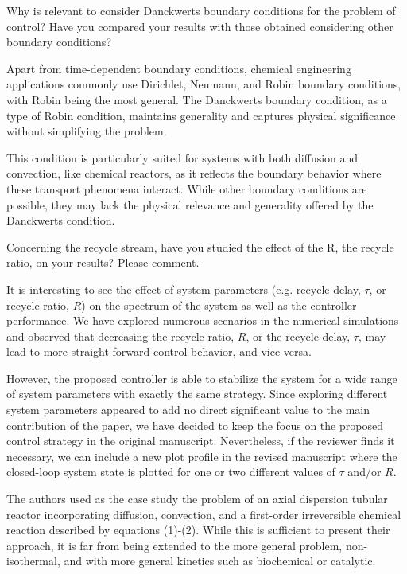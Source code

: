 \documentclass[12pt,answers]{exam}
\begin{document}
\begin{questions}

    \question Why is relevant to consider Danckwerts boundary conditions for the problem of control? Have you compared your results with those obtained considering other boundary conditions?

    \begin{solutionorbox}
        Apart from time-dependent boundary conditions, chemical engineering applications commonly use Dirichlet, Neumann, and Robin boundary conditions, with Robin being the most general. The Danckwerts boundary condition, as a type of Robin condition, maintains generality and captures physical significance without simplifying the problem.

        This condition is particularly suited for systems with both diffusion and convection, like chemical reactors, as it reflects the boundary behavior where these transport phenomena interact. While other boundary conditions are possible, they may lack the physical relevance and generality offered by the Danckwerts condition. 
    \end{solutionorbox}


    \question Concerning the recycle stream, have you studied the effect of the R, the recycle ratio, on your results? Please comment.

    \begin{solutionorbox}
        It is interesting to see the effect of system parameters (e.g. recycle delay, $\tau$, or recycle ratio, $R$) on the spectrum of the system as well as the controller performance. We have explored numerous scenarios in the numerical simulations and observed that decreasing the recycle ratio, $R$, or the recycle delay, $\tau$, may lead to more straight forward control behavior, and vice versa. 
        
        However, the proposed controller is able to stabilize the system for a wide range of system parameters with exactly the same strategy. Since exploring different system parameters appeared to add no direct significant value to the main contribution of the paper, we have decided to keep the focus on the proposed control strategy in the original manuscript. Nevertheless, if the reviewer finds it necessary, we can include a new plot profile in the revised manuscript where the closed-loop system state is plotted for one or two different values of $\tau$ and/or $R$.
    \end{solutionorbox}

    
    \question The authors used as the case study the problem of an axial dispersion tubular reactor incorporating diffusion, convection, and a first-order irreversible chemical reaction described by equations (1)-(2). While this is sufficient to present their approach, it is far from being extended to the more general problem, non-isothermal, and with more general kinetics such as biochemical or catalytic.


\end{questions}
\end{document}
